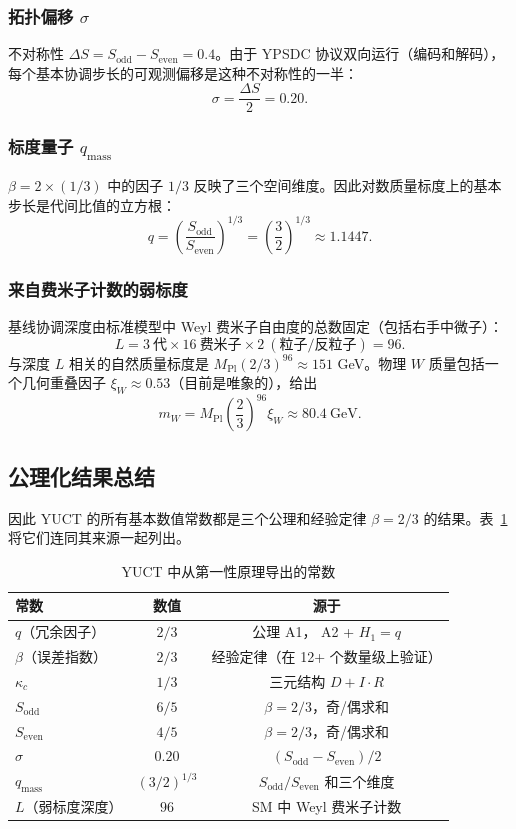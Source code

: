 \documentclass[11pt,a4paper]{article}
\begin{document}
	\subsubsection{拓扑偏移 \(\sigma\)}
	不对称性 \(\Delta S = S_{\mathrm{odd}}-S_{\mathrm{even}} = 0.4\)。由于 YPSDC 协议双向运行（编码和解码），每个基本协调步长的可观测偏移是这种不对称性的一半：
	\[
	\boxed{\sigma = \frac{\Delta S}{2} = 0.20}.
	\]
	
	\subsubsection{标度量子 \(q_{\text{mass}}\)}
	\(\beta = 2 \times (1/3)\) 中的因子 \(1/3\) 反映了三个空间维度。因此对数质量标度上的基本步长是代间比值的立方根：
	\[
	\boxed{q = \left(\frac{S_{\mathrm{odd}}}{S_{\mathrm{even}}}\right)^{1/3} = \left(\frac{3}{2}\right)^{1/3} \approx 1.1447}.
	\]
	
	\subsubsection{来自费米子计数的弱标度}
	基线协调深度由标准模型中 Weyl 费米子自由度的总数固定（包括右手中微子）：
	\[
	L = 3\ \text{代} \times 16\ \text{费米子} \times 2\ (\text{粒子/反粒子}) = 96.
	\]
	与深度 \(L\) 相关的自然质量标度是 \(M_{\mathrm{Pl}} (2/3)^{96} \approx 151\) GeV。物理 \(W\) 质量包括一个几何重叠因子 \(\xi_W \approx 0.53\)（目前是唯象的），给出
	\[
	m_W = M_{\mathrm{Pl}} \left(\frac{2}{3}\right)^{96} \xi_W \approx 80.4\ \text{GeV}.
	\]
	
	\subsection{公理化结果总结}
	
	因此 YUCT 的所有基本数值常数都是三个公理和经验定律 \(\beta=2/3\) 的结果。表~\ref{tab:derived-constants} 将它们连同其来源一起列出。
	
	\begin{table}[H]
		\centering
		\caption{YUCT 中从第一性原理导出的常数}
		\label{tab:derived-constants}
		\begin{tabular}{l c c}
			\toprule
			\textbf{常数} & \textbf{数值} & \textbf{源于} \\
			\midrule
			\(q\)（冗余因子） & \(2/3\) & 公理 A1， A2 + \(H_1=q\) \\
			\(\beta\)（误差指数） & \(2/3\) & 经验定律（在 12+ 个数量级上验证） \\
			\(\kappa_c\) & \(1/3\) & 三元结构 \(D+I\!\cdot\!R\) \\
			\(S_{\mathrm{odd}}\) & \(6/5\) & \(\beta=2/3\)，奇/偶求和 \\
			\(S_{\mathrm{even}}\) & \(4/5\) & \(\beta=2/3\)，奇/偶求和 \\
			\(\sigma\) & \(0.20\) & \((S_{\mathrm{odd}}-S_{\mathrm{even}})/2\) \\
			\(q_{\text{mass}}\) & \((3/2)^{1/3}\) & \(S_{\mathrm{odd}}/S_{\mathrm{even}}\) 和三个维度 \\
			\(L\)（弱标度深度） & \(96\) & SM 中 Weyl 费米子计数 \\
			\bottomrule
		\end{tabular}
	\end{table}
	
\end{document}
